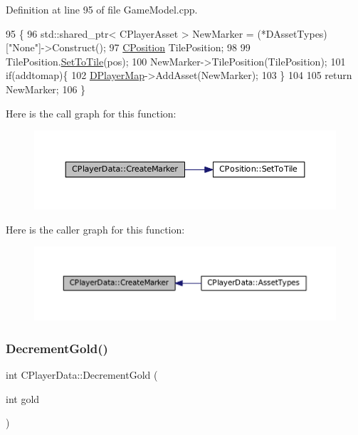 Definition at line 95 of file Game\+Model.\+cpp.


\begin{DoxyCode}
95                                                                                           \{
96     std::shared\_ptr< CPlayerAsset > NewMarker = (*DAssetTypes)[\textcolor{stringliteral}{"None"}]->Construct();
97     \hyperlink{classCPosition}{CPosition} TilePosition;
98     
99     TilePosition.\hyperlink{classCPosition_ae302aa21792de64c97de29e2cbbfeb94}{SetToTile}(pos);
100     NewMarker->TilePosition(TilePosition);
101     \textcolor{keywordflow}{if}(addtomap)\{
102         \hyperlink{classCPlayerData_a452163191cd4603e1e38dd8d4bb9691c}{DPlayerMap}->AddAsset(NewMarker);
103     \}
104     
105     \textcolor{keywordflow}{return} NewMarker;
106 \}
\end{DoxyCode}
Here is the call graph for this function\+:\nopagebreak
\begin{figure}[H]
\begin{center}
\leavevmode
\includegraphics[width=350pt]{classCPlayerData_a4ef7c98c3b0f28354a2bccc2782b57ad_cgraph}
\end{center}
\end{figure}
Here is the caller graph for this function\+:\nopagebreak
\begin{figure}[H]
\begin{center}
\leavevmode
\includegraphics[width=350pt]{classCPlayerData_a4ef7c98c3b0f28354a2bccc2782b57ad_icgraph}
\end{center}
\end{figure}
\hypertarget{classCPlayerData_ac072cd77c60b35920a278aaffcefd3fd}{}\label{classCPlayerData_ac072cd77c60b35920a278aaffcefd3fd} 
\subsubsection{\texorpdfstring{Decrement\+Gold()}{DecrementGold()}}
{\footnotesize\ttfamily int C\+Player\+Data\+::\+Decrement\+Gold (\begin{DoxyParamCaption}\item[{int}]{gold }\end{DoxyParamCaption})\hspace{0.3cm}{\ttfamily [inline]}}




